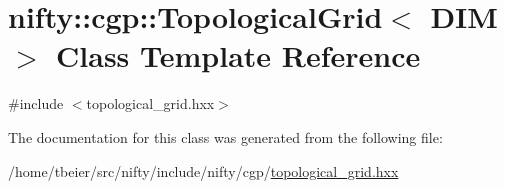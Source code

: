 \hypertarget{classnifty_1_1cgp_1_1TopologicalGrid}{}\section{nifty\+:\+:cgp\+:\+:Topological\+Grid$<$ D\+I\+M $>$ Class Template Reference}
\label{classnifty_1_1cgp_1_1TopologicalGrid}


{\ttfamily \#include $<$topological\+\_\+grid.\+hxx$>$}



The documentation for this class was generated from the following file\+:\begin{DoxyCompactItemize}
\item 
/home/tbeier/src/nifty/include/nifty/cgp/\hyperlink{topological__grid_8hxx}{topological\+\_\+grid.\+hxx}\end{DoxyCompactItemize}
